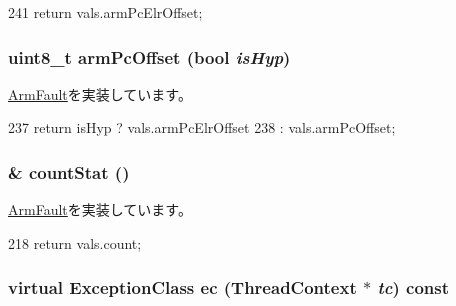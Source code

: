 \begin{DoxyCode}
241 { return vals.armPcElrOffset; }
\end{DoxyCode}
\hypertarget{classArmISA_1_1ArmFaultVals_a3a08a20ac78186f405db46f8b3373e2f}{
\subsubsection[{armPcOffset}]{\setlength{\rightskip}{0pt plus 5cm}uint8\_\-t armPcOffset (bool {\em isHyp})}}
\label{classArmISA_1_1ArmFaultVals_a3a08a20ac78186f405db46f8b3373e2f}


\hyperlink{classArmISA_1_1ArmFault_a62f88e7446d881692b70a4c53a66709e}{ArmFault}を実装しています。


\begin{DoxyCode}
237                                       { return isHyp ? vals.armPcElrOffset
238                                                      : vals.armPcOffset; }
\end{DoxyCode}
\hypertarget{classArmISA_1_1ArmFaultVals_a6c79663c761ff57265459f7e3aefaf4c}{
\subsubsection[{countStat}]{\& countStat ()}}
\label{classArmISA_1_1ArmFaultVals_a6c79663c761ff57265459f7e3aefaf4c}


\hyperlink{classArmISA_1_1ArmFault_a5d92ccd11b5cd6b04f02bd0a088b776c}{ArmFault}を実装しています。


\begin{DoxyCode}
218 { return vals.count; }
\end{DoxyCode}
\hypertarget{classArmISA_1_1ArmFaultVals_aa4dd5fb47a1253dbe17e692e905a8c7c}{
\subsubsection[{ec}]{\setlength{\rightskip}{0pt plus 5cm}virtual {\bf ExceptionClass} ec ({\bf ThreadContext} $\ast$ {\em tc}) const}}
\label{classArmISA_1_1ArmFaultVals_aa4dd5fb47a1253dbe17e692e905a8c7c}


